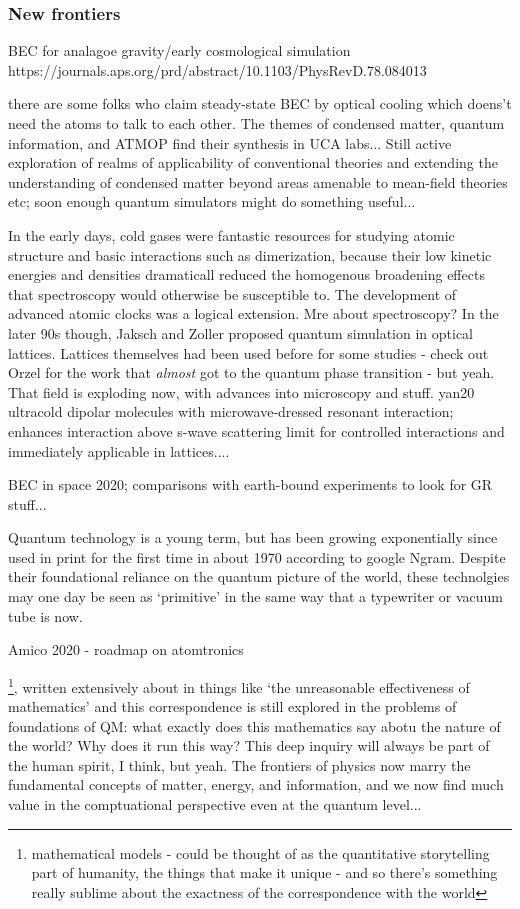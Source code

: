 \subsubsection{New frontiers}

	BEC for analagoe gravity/early cosmological simulation
		https://journals.aps.org/prd/abstract/10.1103/PhysRevD.78.084013

	there are some folks who claim steady-state BEC by optical cooling which doens't need the atoms to talk to each other.
	The themes of condensed matter, quantum information, and ATMOP find their synthesis in UCA labs...
	Still active exploration of realms of applicability of conventional theories and extending the understanding of condensed matter beyond areas amenable to mean-field theories etc; soon enough quantum simulators might do something useful... 
	

	In the early days, cold gases were fantastic resources for studying atomic structure and basic interactions such as dimerization, because their low kinetic energies and densities dramaticall reduced the homogenous broadening effects that spectroscopy would otherwise be susceptible to. The development of advanced atomic clocks was a logical extension. Mre about spectroscopy? In the later 90s though, Jaksch and Zoller proposed quantum simulation in optical lattices. Lattices themselves had been used before for some studies - check out Orzel for the work that \emph{almost} got to the quantum phase transition - but yeah. That field is exploding now, with advances into microscopy and stuff. 	yan20 ultracold dipolar molecules with microwave-dressed resonant interaction; enhances interaction above s-wave scattering limit for controlled interactions and immediately applicable in lattices....

	BEC in space 2020; comparisons with earth-bound experiments to look for GR stuff...

	
	Quantum technology is a young term, but has been growing exponentially	since used in print for the first time in about 1970 according to google	Ngram. 
	Despite their foundational reliance on the quantum picture
	of the world, these technolgies may one day be seen as `primitive' in
	the same way that a typewriter or vacuum tube is now.

	Amico 2020 - roadmap on atomtronics

\footnote{mathematical models - could be thought of as the quantitative storytelling part of humanity, the things that make it unique - and so there's something really sublime about the exactness of the correspondence with the world}, written extensively about in things like `the unreasonable effectiveness of mathematics' and this correspondence is still explored in the problems of foundations of QM: what exactly does this mathematics say abotu the nature of the world? Why does it run this way? This deep inquiry will always be part of the human spirit, I think, but yeah.
The frontiers of physics now marry the fundamental concepts of matter, energy, and information, and we now find much value in the comptuational perspective even at the quantum level...

